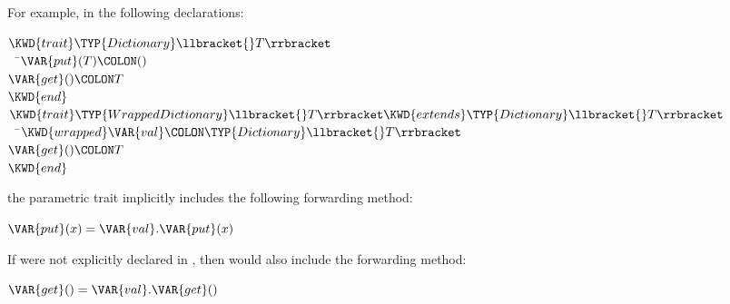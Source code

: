 For example, in the following declarations:
%
\begin{Fortress}
\(\KWD{trait} \TYP{Dictionary}\llbracket{}T\rrbracket\)\\
{\tt~~}\pushtabs\=\+\(  \VAR{put}(T)\COLON ()\)\\
\(  \VAR{get}()\COLON T\)\-\\\poptabs
\(\KWD{end}\)\\[4pt]
\(\KWD{trait} \TYP{WrappedDictionary}\llbracket{}T\rrbracket \KWD{extends} \TYP{Dictionary}\llbracket{}T\rrbracket\)\\
{\tt~~}\pushtabs\=\+\(  \KWD{wrapped} \VAR{val}\COLON \TYP{Dictionary}\llbracket{}T\rrbracket\)\\
\(  \VAR{get}()\COLON T\)\-\\\poptabs
\(\KWD{end}\)
\end{Fortress}
the parametric trait  implicitly includes the
following forwarding method:
\begin{Fortress}
\(\VAR{put}(x) = \VAR{val}.\VAR{put}(x)\)
\end{Fortress}
If  were not explicitly declared in , then
 would also include the forwarding method:
\begin{Fortress}
\(\VAR{get}() = \VAR{val}.\VAR{get}()\)
\end{Fortress}

